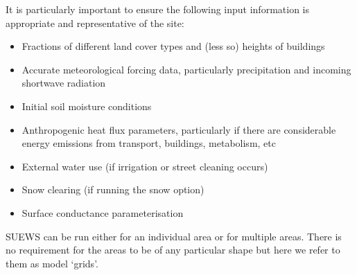 \documentclass[letterpaper,10pt,english]{sphinxmanual}
\begin{document}
It is particularly important to ensure the following input information
is appropriate and representative of the site:
\begin{itemize}
\item {} 
Fractions of different land cover types and (less so) heights of
buildings \label{\detokenize{prepare-to-run-the-model:id1}}{\hyperref[\detokenize{references:w16}]{\sphinxcrossref{{[}W16{]}}}}

\item {} 
Accurate meteorological forcing data, particularly precipitation and
incoming shortwave radiation \label{\detokenize{prepare-to-run-the-model:id2}}{\hyperref[\detokenize{references:ko17}]{\sphinxcrossref{{[}Ko17{]}}}}

\item {} 
Initial soil moisture conditions \label{\detokenize{prepare-to-run-the-model:id3}}{\hyperref[\detokenize{references:best2014}]{\sphinxcrossref{{[}Best2014{]}}}}

\item {} 
Anthropogenic heat flux parameters, particularly if there are
considerable energy emissions from transport, buildings, metabolism,
etc \label{\detokenize{prepare-to-run-the-model:id4}}{\hyperref[\detokenize{references:w16}]{\sphinxcrossref{{[}W16{]}}}}

\item {} 
External water use (if irrigation or street cleaning occurs)

\item {} 
Snow clearing (if running the snow option)

\item {} 
Surface conductance parameterisation \label{\detokenize{prepare-to-run-the-model:id5}}{\hyperref[\detokenize{references:j11}]{\sphinxcrossref{{[}J11{]}}}} \label{\detokenize{prepare-to-run-the-model:id6}}{\hyperref[\detokenize{references:w16}]{\sphinxcrossref{{[}W16{]}}}}

\end{itemize}

SUEWS can be run either for an individual area or for multiple areas.
There is no requirement for the areas to be of any particular shape but
here we refer to them as model ‘grids’.
\end{document}
